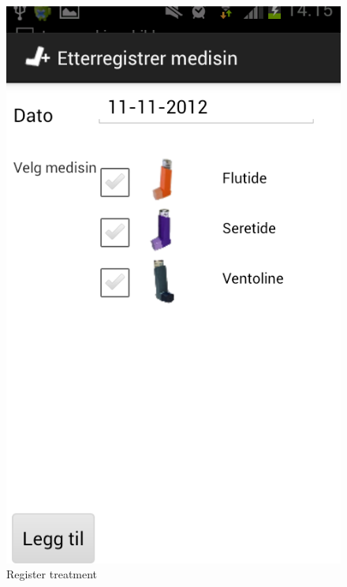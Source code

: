 \begin{figure}
\begin{minipage}[b]{0.3\linewidth}
		\includegraphics[width=0.20\paperwidth]{Pictures/app-screenshots/register_treatment.png}
		\caption{Register treatment}
		\label{fig:gapp-register-treatment}
	\end{minipage}
	\begin{minipage}[b]{0.3\linewidth}
		\centering

\end{minipage}
\end{figure}
